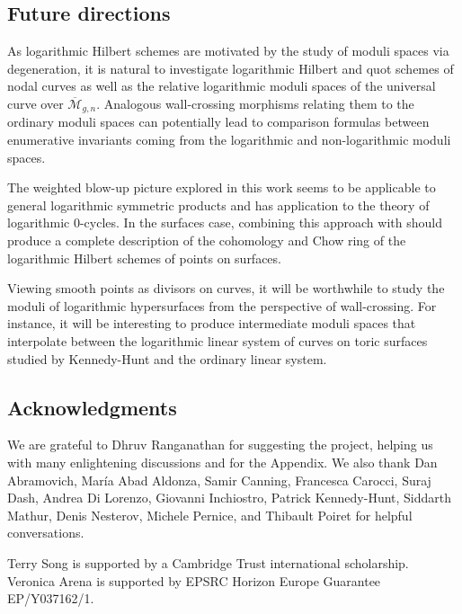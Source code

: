 \documentclass[10.5pt]{amsart}
\theoremstyle{definition}
\theoremstyle{definition}
\theoremstyle{definition}
\theoremstyle{definition}
\newcommand{\ol}[1]{\overline{#1}}
\newcommand{\Mcal}{\mathcal{M}}
\newcommand{\Mbar}{\ol{\Mcal}}
\begin{document}
\subsection{Future directions}
As logarithmic Hilbert schemes are motivated by the study of moduli spaces via degeneration, it is natural to investigate logarithmic Hilbert and quot schemes of nodal curves {as well as the relative logarithmic moduli spaces of the universal curve over $\Mbar_{g,n}$}. {Analogous wall-crossing morphisms relating them to the ordinary moduli spaces can potentially lead to comparison formulas between enumerative invariants coming from the logarithmic and non-logarithmic moduli spaces.}


The weighted blow-up picture explored in this work seems to be applicable to general logarithmic symmetric products and has application to the theory of logarithmic 0-cycles. In the surfaces case, combining this approach with \cite[§4]{MR25} should produce a complete description of the cohomology and Chow ring of the logarithmic Hilbert schemes of points on surfaces. 

{Viewing smooth points as divisors on curves, it will be worthwhile to study the moduli of logarithmic hypersurfaces from the perspective of wall-crossing. For instance, it will be interesting to produce intermediate moduli spaces that interpolate between the logarithmic linear system of curves on toric surfaces studied by Kennedy-Hunt \cite{kh21} and the ordinary linear system.}

\subsection{Acknowledgments}
We are grateful to Dhruv Ranganathan for suggesting the project, helping us with many enlightening discussions and for the Appendix. We also thank Dan Abramovich, María Abad Aldonza, Samir Canning, Francesca Carocci, Suraj Dash, Andrea Di Lorenzo, Giovanni Inchiostro, Patrick Kennedy-Hunt, Siddarth Mathur, Denis Nesterov, Michele Pernice, and Thibault Poiret for helpful conversations.

Terry Song is supported by a Cambridge Trust international scholarship. Veronica Arena is supported by EPSRC Horizon Europe Guarantee EP/Y037162/1.
\end{document}
